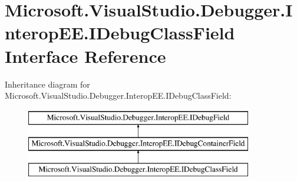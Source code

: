 \hypertarget{interface_microsoft_1_1_visual_studio_1_1_debugger_1_1_interop_e_e_1_1_i_debug_class_field}{\section{Microsoft.\+Visual\+Studio.\+Debugger.\+Interop\+E\+E.\+I\+Debug\+Class\+Field Interface Reference}
\label{interface_microsoft_1_1_visual_studio_1_1_debugger_1_1_interop_e_e_1_1_i_debug_class_field}
}
Inheritance diagram for Microsoft.\+Visual\+Studio.\+Debugger.\+Interop\+E\+E.\+I\+Debug\+Class\+Field\+:\begin{figure}[H]
\begin{center}
\leavevmode
\includegraphics[height=3.000000cm]{interface_microsoft_1_1_visual_studio_1_1_debugger_1_1_interop_e_e_1_1_i_debug_class_field}
\end{center}
\end{figure}
